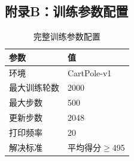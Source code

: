 \documentclass[12pt,a4paper]{article}
\begin{document}
\subsection*{附录B：训练参数配置}

\begin{table}[H]
    \centering
    \caption{完整训练参数配置}
    \begin{tabular}{ll}
        \toprule
        \textbf{参数} & \textbf{值} \\
        \midrule
        环境 & CartPole-v1 \\
        最大训练轮数 & 2000 \\
        最大步数 & 500 \\
        更新步数 & 2048 \\
        打印频率 & 20 \\
        解决标准 & 平均得分$\geq$495 \\
        \bottomrule
    \end{tabular}
\end{table}
\end{document}
